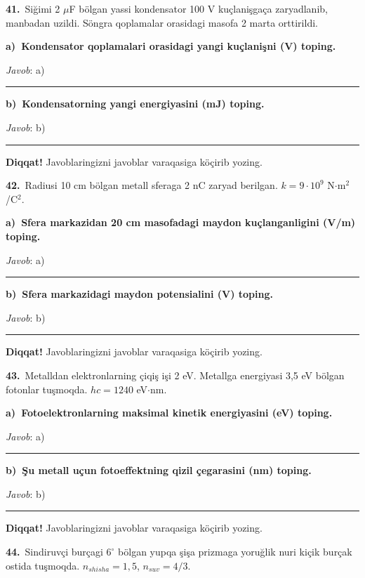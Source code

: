 \documentclass[11pt,a4paper]{article}
\newcommand{\blank}{\rule{5cm}{0.4pt}}
\begin{document}
\noindent\textbf{41.}\ Siğimi 2 $\mu$F bölgan yassi kondensator 100 V kuçlanişgaça zaryadlanib, manbadan uzildi. Söngra qoplamalar orasidagi masofa 2 marta orttirildi.\par\smallskip
\medskip\noindent\textbf{a)\ Kondensator qoplamalari orasidagi yangi kuçlanişni (V) toping.}\par
\noindent\textit{Javob}: a)\ \blank\par
\medskip\noindent\textbf{b)\ Kondensatorning yangi energiyasini (mJ) toping.}\par
\noindent\textit{Javob}: b)\ \blank\par
\medskip\noindent\textbf{Diqqat!} Javoblaringizni javoblar varaqasiga köçirib yozing.\par\vspace{10pt}
\noindent\textbf{42.}\ Radiusi 10 cm bölgan metall sferaga 2 nC zaryad berilgan. $k=9\cdot10^9$ N$\cdot$m$^2$/C$^2$.\par\smallskip
\medskip\noindent\textbf{a)\ Sfera markazidan 20 cm masofadagi maydon kuçlanganligini (V/m) toping.}\par
\noindent\textit{Javob}: a)\ \blank\par
\medskip\noindent\textbf{b)\ Sfera markazidagi maydon potensialini (V) toping.}\par
\noindent\textit{Javob}: b)\ \blank\par
\medskip\noindent\textbf{Diqqat!} Javoblaringizni javoblar varaqasiga köçirib yozing.\par\vspace{10pt}
\noindent\textbf{43.}\ Metalldan elektronlarning çiqiş işi 2 eV. Metallga energiyasi 3,5 eV bölgan fotonlar tuşmoqda. $hc=1240$ eV$\cdot$nm.\par\smallskip
\medskip\noindent\textbf{a)\ Fotoelektronlarning maksimal kinetik energiyasini (eV) toping.}\par
\noindent\textit{Javob}: a)\ \blank\par
\medskip\noindent\textbf{b)\ Şu metall uçun fotoeffektning qizil çegarasini (nm) toping.}\par
\noindent\textit{Javob}: b)\ \blank\par
\medskip\noindent\textbf{Diqqat!} Javoblaringizni javoblar varaqasiga köçirib yozing.\par\vspace{10pt}
\noindent\textbf{44.}\ Sindiruvçi burçagi $6^\circ$ bölgan yupqa şişa prizmaga yoruğlik nuri kiçik burçak ostida tuşmoqda. $n_{shisha}=1{,}5$, $n_{suv}=4/3$.\par\smallskip
\end{document}
